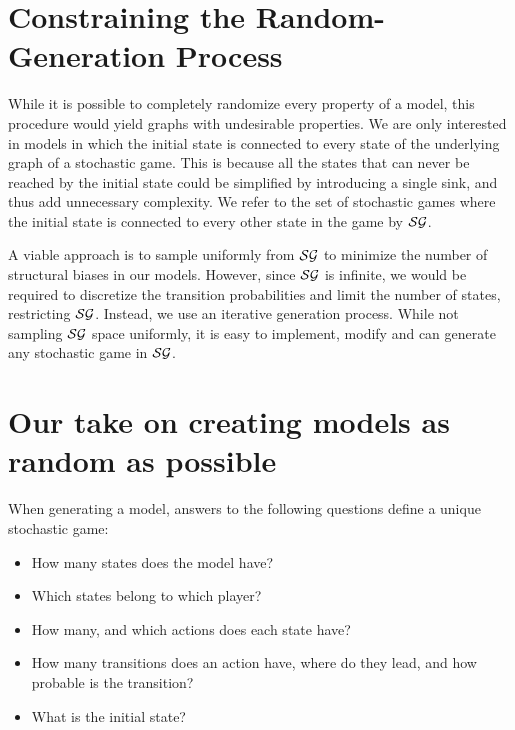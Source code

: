 
\section{Constraining the Random-Generation Process}
While it is possible to completely randomize every property of a model, this procedure would yield graphs with undesirable properties. 
We are only interested in models in which the initial state is connected to every state of the underlying graph of a stochastic game. 
This is because all the states that can never be reached by the initial state could be simplified by introducing a single sink, and thus add unnecessary complexity.
We refer to the set of stochastic games where the initial state is connected to every other state in the game by $\mathcal{SG}$.

A viable approach is to sample uniformly from $\mathcal{SG}$ to minimize the number of structural biases in our models.
However, since $\mathcal{SG}$ is infinite, we would be required to discretize the transition probabilities and limit the number of states,
restricting $\mathcal{SG}$.
Instead, we use an iterative generation process.
While not sampling $\mathcal{SG}$ space uniformly, it is easy to implement, modify and can generate any stochastic game in $\mathcal{SG}$.

\section{Our take on creating models as random as possible} \label{sec:randomGenAlgo}
When generating a model, answers to the following questions define a unique stochastic game:
\begin{itemize}
    \item How many states does the model have?
    \item Which states belong to which player?
    \item How many, and which actions does each state have?
    \item How many transitions does an action have, where do they lead, and how probable is the transition?
    \item What is the initial state?
\end{itemize}

